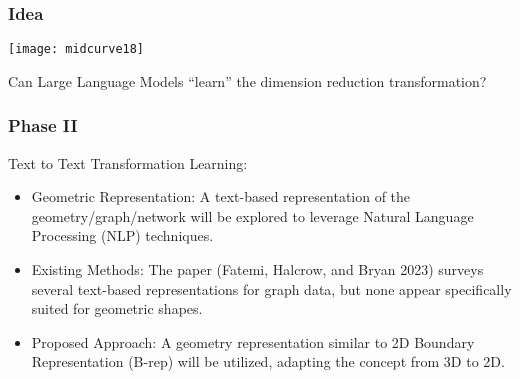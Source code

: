 \begin{frame}[fragile]\frametitle{Idea}
\begin{center}
\texttt{[image: midcurve18]}

Can Large Language Models ``learn'' the dimension reduction transformation?
\end{center}	
\end{frame}

\begin{frame}[fragile]\frametitle{Phase II}

Text to Text Transformation Learning:

\begin{itemize}
\item Geometric Representation: A text-based representation of the geometry/graph/network will be explored to leverage Natural Language Processing (NLP) techniques.
\item Existing Methods: The paper (Fatemi, Halcrow, and Bryan 2023) surveys several text-based representations for graph data, but none appear specifically suited for geometric shapes.
\item Proposed Approach: A geometry representation similar to 2D Boundary Representation (B-rep) will be utilized, adapting the concept from 3D to 2D.
\end{itemize}	

\end{frame}

